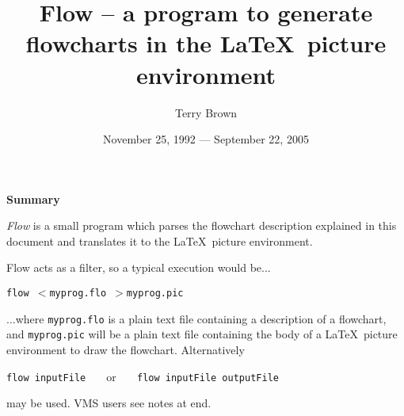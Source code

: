 

\setlength{\unitlength}{2em} %

\setlength{\parindent}{0pt}
\setlength{\parskip}{2ex}
\addtolength{\topmargin}{-1cm}
\addtolength{\textheight}{2cm}
\addtolength{\evensidemargin}{-1cm}
\addtolength{\oddsidemargin}{-1cm}
\addtolength{\textwidth}{2cm}
\newcommand{\headA}[1]{{\huge \vspace{1ex} \bf \hfill #1 \vspace{1ex}\hfill}}
\newcommand{\headB}[1]{{\Large \vspace{1ex} \bf #1 \vspace{1ex} }}
\newcommand{\headC}[1]{{\large \vspace{1ex} \bf #1 \vspace{1ex} }}
\newcommand{\headD}[1]{{\bf \vspace{1ex} #1 \vspace{1ex} }}

\newcommand{\pushin}{\hspace*{1em}}



\title{Flow -- a program to generate flowcharts in the \LaTeX\
       picture environment}
\author{Terry Brown}
\date{November 25, 1992 --- September 22, 2005}
\maketitle

\headB{Summary}

{\em Flow\/} is a small program which parses the flowchart description
explained in this document and translates it to the \LaTeX\ picture
environment.

Flow acts as a filter, so a typical execution would be...

\verb+flow +$<$\verb+myprog.flo +$>$\verb+myprog.pic+

...where \verb+myprog.flo+ is a plain text file containing a description of a
flowchart, and \verb+myprog.pic+ will be a plain text file containing the
body of a \LaTeX\ picture environment to draw the flowchart.  Alternatively

\verb+flow inputFile   + or \verb+   flow inputFile outputFile+

may be used.  VMS users see notes at end.

